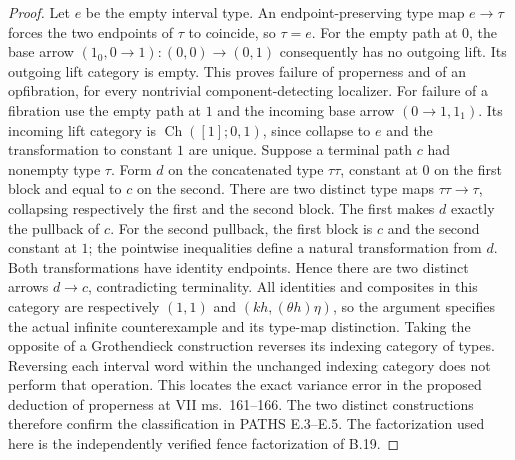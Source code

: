 \begin{proof}
Let $e$ be the empty interval type. An endpoint-preserving type map
$e\to\tau$ forces the two endpoints of $\tau$ to coincide, so $\tau=e$.
For the empty path at $0$, the base arrow
$(1_0,0\to1):(0,0)\to(0,1)$ consequently has no outgoing lift.
Its outgoing lift category is empty. This proves failure of properness
and of an opfibration, for every nontrivial component-detecting localizer.
For failure of a fibration use the empty path at $1$ and the incoming
base arrow $(0\to1,1_1)$. Its incoming lift category is
$\operatorname{Ch}([1];0,1)$, since collapse to $e$ and the transformation
to constant $1$ are unique. Suppose a terminal path $c$ had nonempty
type $\tau$. Form $d$ on the concatenated type $\tau\tau$, constant
at $0$ on the first block and equal to $c$ on the second.
There are two distinct type maps $\tau\tau\to\tau$, collapsing
respectively the first and the second block. The first makes $d$ exactly
the pullback of $c$. For the second pullback, the first block is $c$ and
the second constant at $1$; the pointwise inequalities define a natural
transformation from $d$. Both transformations have identity endpoints.
Hence there are two distinct arrows $d\to c$, contradicting terminality.
All identities and composites in this category are respectively
$(1,1)$ and $(kh,(\theta h)\eta)$, so the argument specifies the
actual infinite counterexample and its type-map distinction.
Taking the opposite of a Grothendieck construction reverses its indexing
category of types. Reversing each interval word within the unchanged
indexing category does not perform that operation. This locates the exact
variance error in the proposed deduction of properness at VII ms.~161--166.
The two distinct constructions therefore confirm the classification in
PATHS E.3--E.5. The factorization used here is the independently verified
fence factorization of B.19.
\end{proof}

